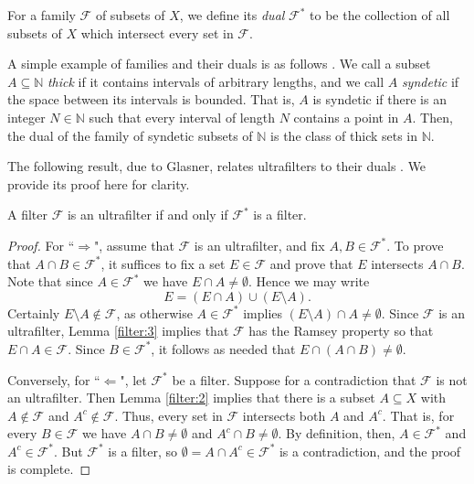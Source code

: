 For a family \( \mathcal{F} \) of subsets of \( X \), we define its \emph{dual} \( \mathcal{F} ^{\ast} \) to be the collection of all subsets of \( X \) which intersect every set in \( \mathcal{F} \).

A simple example of families and their duals is as follows \cite{brian:2016}. We call a subset \( A \subseteq \mathbb{N} \) \emph{thick} if it contains intervals of arbitrary lengths, and we call \( A \) \emph{syndetic} if the space between its intervals is bounded. That is, \( A \) is syndetic if there is an integer \( N \in \mathbb{N} \) such that every interval of length \( N \) contains a point in \( A \). Then, the dual of the family of syndetic subsets of \( \mathbb{N} \) is the class of thick sets in \( \mathbb{N} \).

The following result, due to Glasner, relates ultrafilters to their duals \cite{glasner:1980}. We provide its proof here for clarity.

\begin{lemma}
\label{filter:4}
A filter \( \mathcal{F} \) is an ultrafilter if and only if \( \mathcal{F} ^{\ast} \) is a filter.
\end{lemma}
\begin{proof}
For ``$\Rightarrow$", assume that \( \mathcal{F} \) is an ultrafilter, and fix \( A,B \in \mathcal{F} ^{\ast} \). To prove that \( A \cap B \in \mathcal{F} ^{\ast} \), it suffices to fix a set \( E \in \mathcal{F} \) and prove that \( E \) intersects \( A \cap B \). Note that since \( A \in \mathcal{F} ^{\ast} \) we have \( E \cap A \neq \emptyset \). Hence we may write \[ E = (E \cap A) \cup (E \setminus A). \] Certainly \( E \setminus A \notin \mathcal{F} \), as otherwise \( A \in \mathcal{F} ^{\ast} \) implies \( (E\setminus A) \cap A \neq \emptyset \). Since \( \mathcal{F} \) is an ultrafilter, Lemma \ref{filter:3} implies that \( \mathcal{F} \) has the Ramsey property so that \( E \cap A \in \mathcal{F} \). Since \( B \in \mathcal{F} ^{\ast} \), it follows as needed that \( E \cap (A \cap B) \neq \emptyset \).

Conversely, for ``$\Leftarrow$", let \( \mathcal{F} ^{\ast} \) be a filter. Suppose for a contradiction that \( \mathcal{F} \) is not an ultrafilter. Then Lemma \ref{filter:2} implies that there is a subset \( A \subseteq X \) with \( A \notin \mathcal{F} \) and \( A^{c} \notin \mathcal{F} \). Thus, every set in \( \mathcal{F} \) intersects both \( A \) and \( A^{c} \). That is, for every \( B \in \mathcal{F} \) we have \( A \cap B \neq \emptyset \) and \( A^{c} \cap B \neq \emptyset \). By definition, then, \( A \in \mathcal{F}^{\ast} \) and \( A^{c} \in \mathcal{F} ^{\ast} \). But \( \mathcal{F} ^{\ast} \) is a filter, so \( \emptyset = A \cap A^{c} \in \mathcal{F} ^{\ast} \) is a contradiction, and the proof is complete.
\end{proof}
